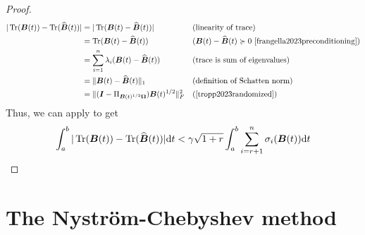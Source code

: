 \begin{proof}
    \begin{align}
        |\Tr(\mtx{B}(t)) - \Tr(\widehat{\mtx{B}}(t))|
            &= |\Tr(\mtx{B}(t) - \widehat{\mtx{B}}(t))| && \text{(linearity of trace)} \notag \\ 
            &= \Tr(\mtx{B}(t) - \widehat{\mtx{B}}(t)) &&  \text{($\mtx{B}(t) - \widehat{\mtx{B}}(t) \succcurlyeq 0$ \cite[lemma~2.1]{frangella2023preconditioning})} \notag \\ 
            &= \sum_{i=1}^n \lambda_i(\mtx{B}(t) - \widehat{\mtx{B}}(t)) &&  \text{(trace is sum of eigenvalues)} \notag \\
            &= \lVert \mtx{B}(t) - \widehat{\mtx{B}}(t) \rVert _1 && \text{(definition of Schatten norm)} \notag \\
            &= \lVert (\mtx{I} - \Pi_{\mtx{B}(t)^{1/2} \mtx{\Omega}})\mtx{B}(t)^{1/2} \rVert _F^2 && \text{(\cite[proof of corollary 8.8]{tropp2023randomized})}
    \end{align}
    Thus, we can apply \cite[theorem~9]{kressner2023randomized} to get
    \begin{equation}
        \int_{a}^{b} |\operatorname{Tr}(\boldsymbol{B}(t)) - \operatorname{Tr}(\widehat{\boldsymbol{B}}(t))| \mathrm{d}t
            < \gamma \sqrt{1 + r} \int_{a}^{b} \sum_{i = r+1}^n \sigma_i(\boldsymbol{B}(t)) \mathrm{d}t
    \end{equation}
\end{proof}


\section{The Nystr\"om-Chebyshev method}
\label{sec:3-nystrom-nystrom-chebyshev}

